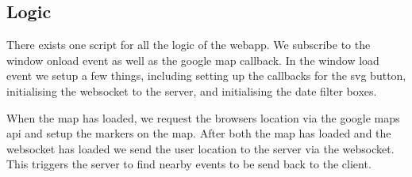 \documentclass[10pt]{article}
\begin{document}
        \subsection{Logic}
            There exists one script for all the logic of the webapp. We subscribe to the window onload event as well as the google map callback. In the window load event we setup a few things, including setting up the callbacks for the svg button, initialising the websocket to the server, and initialising the date filter boxes.

            When the map has loaded, we request the browsers location via the google maps api and setup the markers on the map. After both the map has loaded and the websocket has loaded we send the user location to the server via the websocket. This triggers the server to find nearby events to be send back to the client.
\end{document}
